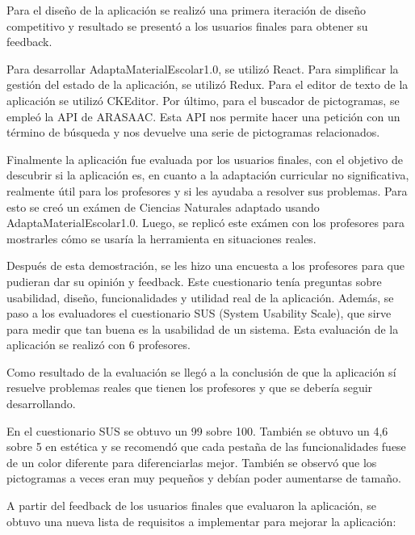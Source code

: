 Para el diseño de la aplicación se realizó una primera iteración de diseño competitivo y resultado se presentó a los usuarios finales para obtener su feedback.

Para desarrollar AdaptaMaterialEscolar1.0, se utilizó React. Para simplificar la gestión del estado de la aplicación, se utilizó Redux. Para el editor de texto de la aplicación se utilizó CKEditor. Por último, para el buscador de pictogramas, se empleó la API de ARASAAC. Esta API nos permite hacer una petición con un término de búsqueda y nos devuelve una serie de pictogramas relacionados.

Finalmente la aplicación fue evaluada por los usuarios finales, con el objetivo de descubrir si la aplicación es, en cuanto a la adaptación curricular no significativa, realmente útil para los profesores y si les ayudaba a resolver sus problemas. Para esto se creó un exámen de Ciencias Naturales adaptado usando AdaptaMaterialEscolar1.0. Luego, se replicó este exámen con los profesores para mostrarles cómo se usaría la herramienta en situaciones reales.

Después de esta demostración, se les hizo una encuesta a los profesores para que pudieran dar su opinión y feedback. Este cuestionario tenía preguntas sobre usabilidad, diseño, funcionalidades y utilidad real de la aplicación. Además, se paso a los evaluadores el cuestionario SUS (System Usability Scale), que sirve para medir que tan buena es la usabilidad de un sistema. Esta evaluación de la aplicación se realizó con 6 profesores.

Como resultado de la evaluación se llegó a la conclusión de que la aplicación sí resuelve problemas reales que tienen los profesores y que se debería seguir desarrollando.

En el cuestionario SUS se obtuvo un 99 sobre 100. También se obtuvo un 4,6 sobre 5 en estética y se recomendó que cada pestaña de las funcionalidades fuese de un color diferente para diferenciarlas mejor. También se observó que los pictogramas a veces eran muy pequeños y debían poder aumentarse de tamaño.

A partir del feedback de los usuarios finales que evaluaron la aplicación, se obtuvo una nueva lista de requisitos a implementar para mejorar la aplicación:

